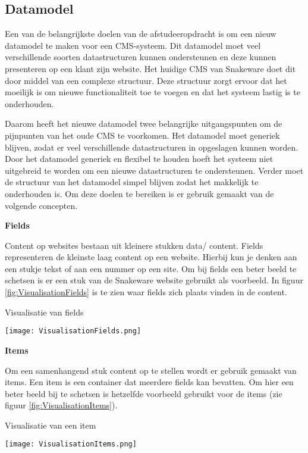 \subsection{Datamodel}
Een van de belangrijkste doelen van de afstudeeropdracht is om een nieuw datamodel te maken voor een CMS-systeem.
Dit datamodel moet veel verschillende soorten datastructuren kunnen ondersteunen en deze kunnen presenteren op een klant zijn website.
Het huidige CMS van Snakeware doet dit door middel van een complexe structuur.
Deze structuur zorgt ervoor dat het moeilijk is om nieuwe functionaliteit toe te voegen en dat het systeem lastig is te onderhouden.

\whitespace
Daarom heeft het nieuwe datamodel twee belangrijke uitgangspunten om de pijnpunten van het oude CMS te voorkomen.
Het datamodel moet generiek blijven, zodat er veel verschillende datastructuren in opgeslagen kunnen worden.
Door het datamodel generiek en flexibel te houden hoeft het systeem niet uitgebreid te worden om een nieuwe datastructuren te ondersteunen.
Verder moet de structuur van het datamodel simpel blijven zodat het makkelijk te onderhouden is.
Om deze doelen te bereiken is er gebruik gemaakt van de volgende concepten.

\whitespace
\textbf{Fields}

\whitespace
Content op websites bestaan uit kleinere stukken data/ content.
Fields representeren de kleinste laag content op een website. 
Hierbij kun je denken aan een stukje tekst of aan een nummer op een site.
Om bij fields een beter beeld te schetsen is er een stuk van de Snakeware website gebruikt als voorbeeld.
In figuur \ref{fig:VisualisationFields} is te zien  waar fields zich plaats vinden in de content.

\whitespace[2]
\begin{graphic}
    \captionsetup{type=figure}
    \caption{Visualisatie van fields}
    \texttt{[image: VisualisationFields.png]}
    \label{fig:VisualisationFields}
\end{graphic}

\whitespace
\textbf{Items}

\whitespace
Om een samenhangend stuk content op te stellen wordt er gebruik gemaakt van items.
Een item is een container dat meerdere fields kan bevatten.
Om hier een beter beeld bij te schetsen is hetzelfde voorbeeld gebruikt voor de items (zie figuur \ref{fig:VisualisationItems}).

\whitespace[2]
\begin{graphic}
    \captionsetup{type=figure}
    \caption{Visualisatie van een item}
    \texttt{[image: VisualisationItems.png]}
    \label{fig:VisualisationItems}
\end{graphic}

